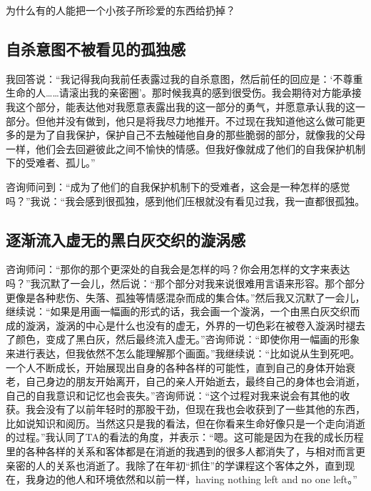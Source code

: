 为什么有的人能把一个小孩子所珍爱的东西给扔掉？



\subsection*{自杀意图不被看见的孤独感}

我回答说：“我记得我向我前任表露过我的自杀意图，然后前任的回应是：‘不尊重生命的人……请滚出我的亲密圈’。那时候我真的感到很受伤。我会期待对方能承接我这个部分，能表达他对我愿意表露出我的这一部分的勇气，并愿意承认我的这一部分。但他并没有做到，他只是将我尽力地推开。不过现在我知道他这么做可能更多的是为了自我保护，保护自己不去触碰他自身的那些脆弱的部分，就像我的父母一样，他们会去回避彼此之间不愉快的情感。但我好像就成了他们的自我保护机制下的受难者、孤儿。”

咨询师问到：“成为了他们的自我保护机制下的受难者，这会是一种怎样的感觉吗？”我说：“我会感到很孤独，感到他们压根就没有看见过我，我一直都很孤独。



\subsection*{逐渐流入虚无的黑白灰交织的漩涡感}

咨询师问：“那你的那个更深处的自我会是怎样的吗？你会用怎样的文字来表达吗？”我沉默了一会儿，然后说：“那个部分对我来说很难用言语来形容。那个部分更像是各种悲伤、失落、孤独等情感混杂而成的集合体。”然后我又沉默了一会儿，继续说：“如果是用画一幅画的形式的话，我会画一个漩涡，一个由黑白灰交织而成的漩涡，漩涡的中心是什么也没有的虚无，外界的一切色彩在被卷入漩涡时褪去了颜色，变成了黑白灰，然后最终流入虚无。”咨询师说：“即使你用一幅画的形象来进行表达，但我依然不怎么能理解那个画面。”我继续说：“比如说从生到死吧。一个人不断成长，开始展现出自身的各种各样的可能性，直到自己的身体开始衰老，自己身边的朋友开始离开，自己的亲人开始逝去，最终自己的身体也会消逝，自己的自我意识和记忆也会丧失。”咨询师说：“这个过程对我来说会有其他的收获。我会没有了以前年轻时的那股干劲，但现在我也会收获到了一些其他的东西，比如说知识和阅历。当然这只是我的看法，但在你看来生命好像只是一个走向消逝的过程。”我认同了TA的看法的角度，并表示：“嗯。这可能是因为在我的成长历程里的各种各样的关系和客体都是在消逝的\pozhehao{}我遇到的很多人都消失了，与相对而言更亲密的人的关系也消逝了。我除了在年初“抓住”的学课程这个客体之外，直到现在，我身边的他人和环境依然和以前一样，having nothing left and no one left。”


